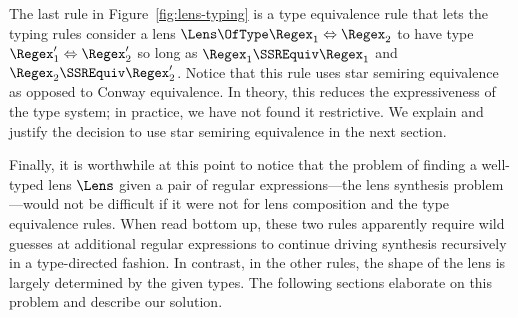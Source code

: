 \documentclass[sigplan,acmsmall]{acmart}
\begin{document}
The last rule in Figure~\ref{fig:lens-typing} is a type equivalence rule
that lets the typing rules consider a lens
$\Lens \OfType \Regex_1 \Leftrightarrow \Regex_2$ to have type
$\Regex_1' \Leftrightarrow \Regex_2'$ so long as
$\Regex_1 \SSREquiv \Regex_1$ and
$\Regex_2 \SSREquiv \Regex_2'$.  Notice that this rule uses star semiring equivalence
as opposed to Conway equivalence.  In theory, this reduces the expressiveness of the
type system; in practice, we have not found it restrictive.  We explain and
justify the decision to use star semiring equivalence in the next section.


Finally, it is worthwhile at this point to notice that the problem of
finding a well-typed lens $\Lens$ given a pair of regular
expressions---the lens synthesis problem---would not be difficult if
it were not for lens composition and the type equivalence rules.  When
read bottom up, these two rules apparently require wild guesses at
additional regular expressions to continue driving synthesis
recursively in a type-directed fashion.  In contrast, in the other
rules, the shape of the lens is largely determined by the given types.
The following sections elaborate on this problem and describe our
solution.


\end{document}
